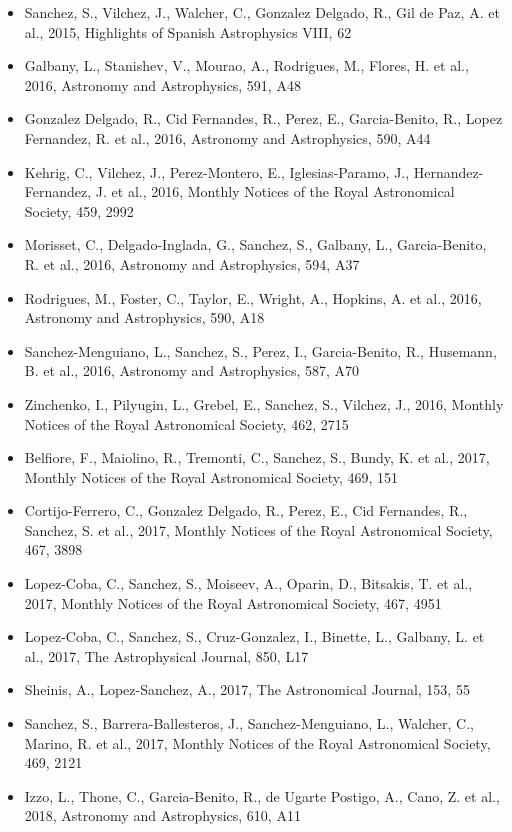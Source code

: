 \documentclass{letter}
\begin{document}
\begin{enumerate}
\begin{itemize}
\item Sanchez, S., Vilchez, J., Walcher, C., Gonzalez Delgado, R., Gil de Paz, A. et al., 2015, Highlights of Spanish Astrophysics VIII, 62
\item Galbany, L., Stanishev, V., Mourao, A., Rodrigues, M., Flores, H. et al., 2016, Astronomy and Astrophysics, 591, A48
\item Gonzalez Delgado, R., Cid Fernandes, R., Perez, E., Garcia-Benito, R., Lopez Fernandez, R. et al., 2016, Astronomy and Astrophysics, 590, A44
\item Kehrig, C., Vilchez, J., Perez-Montero, E., Iglesias-Paramo, J., Hernandez-Fernandez, J. et al., 2016, Monthly Notices of the Royal Astronomical Society, 459, 2992
\item Morisset, C., Delgado-Inglada, G., Sanchez, S., Galbany, L., Garcia-Benito, R. et al., 2016, Astronomy and Astrophysics, 594, A37
\item Rodrigues, M., Foster, C., Taylor, E., Wright, A., Hopkins, A. et al., 2016, Astronomy and Astrophysics, 590, A18
\item Sanchez-Menguiano, L., Sanchez, S., Perez, I., Garcia-Benito, R., Husemann, B. et al., 2016, Astronomy and Astrophysics, 587, A70
\item Zinchenko, I., Pilyugin, L., Grebel, E., Sanchez, S., Vilchez, J., 2016, Monthly Notices of the Royal Astronomical Society, 462, 2715
\item Belfiore, F., Maiolino, R., Tremonti, C., Sanchez, S., Bundy, K. et al., 2017, Monthly Notices of the Royal Astronomical Society, 469, 151
\item Cortijo-Ferrero, C., Gonzalez Delgado, R., Perez, E., Cid Fernandes, R., Sanchez, S. et al., 2017, Monthly Notices of the Royal Astronomical Society, 467, 3898
\item Lopez-Coba, C., Sanchez, S., Moiseev, A., Oparin, D., Bitsakis, T. et al., 2017, Monthly Notices of the Royal Astronomical Society, 467, 4951
\item Lopez-Coba, C., Sanchez, S., Cruz-Gonzalez, I., Binette, L., Galbany, L. et al., 2017, The Astrophysical Journal, 850, L17
\item Sheinis, A., Lopez-Sanchez, A., 2017, The Astronomical Journal, 153, 55
\item Sanchez, S., Barrera-Ballesteros, J., Sanchez-Menguiano, L., Walcher, C., Marino, R. et al., 2017, Monthly Notices of the Royal Astronomical Society, 469, 2121
\item Izzo, L., Thone, C., Garcia-Benito, R., de Ugarte Postigo, A., Cano, Z. et al., 2018, Astronomy and Astrophysics, 610, A11

\end{itemize}
\end{enumerate}
\end{document}
